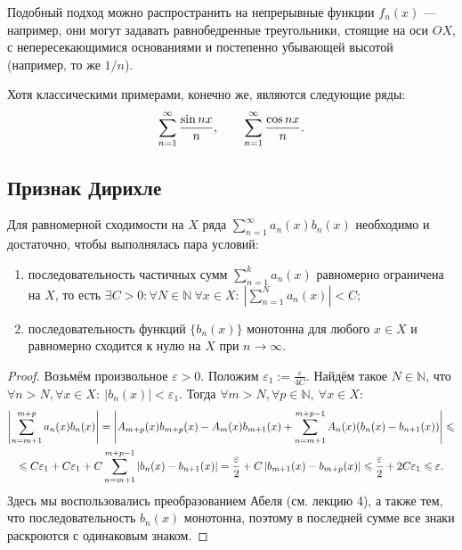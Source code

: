 \documentclass[a4paper, 12pt]{article}
\begin{document}
	Подобный подход можно распространить на непрерывные функции $f_n(x)$ --- например, они могут задавать равнобедренные треугольники, стоящие на оси $OX$, с непересекающимися основаниями и постепенно убывающей высотой (например, то же $1/n$).
	
	Хотя классическими примерами, конечно же, являются следующие ряды:
	$$
	\sum\limits_{n=1}^{\infty} \frac{\sin nx}{n}, \qquad \sum\limits_{n=1}^{\infty} \frac{\cos nx}{n}.
	$$

	\subsection{Признак Дирихле}	
	
	\begin{Test}
		Для равномерной сходимости на $X$ ряда $\sum\limits_{n = 1}^\infty a_n(x) b_n(x)$ необходимо и достаточно, чтобы выполнялась пара условий:
		\begin{enumerate}
			\item  последовательность частичных сумм $\sum\limits_{n = 1}^k a_n(x) $ равномерно ограничена на $X$, то есть $\exists C>0 : \forall N\in \mathbb{N} \ \forall x \in X: \  \left| \sum\limits_{n = 1}^N a_n(x)\right|  <C$;
			
			\item  последовательность функций $\{b_n(x)\}$ монотонна для любого $x \in X$ и равномерно сходится к нулю на $X$ при $n \to \infty$.
		\end{enumerate}
	\end{Test}
	
	\begin{proof}
		Возьмём произвольное $\varepsilon>0$. Положим $\varepsilon_1 := \frac{\varepsilon}{4C}$. Найдём такое $N\in \mathbb{N}$, что $\forall n > N, \forall x \in X: \  \left| b_n(x) \right| < \varepsilon_1.$
		Тогда $\forall m>N, \forall p \in \mathbb{N}, \ \forall x \in X:$
		\begin{multline}
		\left| \sum\limits_{n = m+1}^{m+p} a_n(x) b_n(x)\right| = \left| A_{m+p}(x)b_{m+p}(x) - A_{m}(x)b_{m+1}(x)+ \sum\limits_{n = m+1}^{m+p-1} A_n(x)( b_n(x)-b_{n+1}(x)) \right| \leqslant\\
		\leqslant C\varepsilon_1+C\varepsilon_1+C\sum\limits_{n = m+1}^{m+p-1} | b_n(x)-b_{n+1}(x)|=\frac{\varepsilon}{2} + C\left|b_{m+1}(x) - b_{m+p}(x) \right| \leqslant \frac{\varepsilon}{2} + 2C\varepsilon_1 \leqslant \varepsilon.
		\end{multline}
		Здесь мы воспользовались преобразованием Абеля (см. лекцию 4), а также тем, что последовательность $b_n(x)$ монотонна, поэтому в последней сумме все знаки раскроются с одинаковым знаком.
	\end{proof}
	
\end{document}
